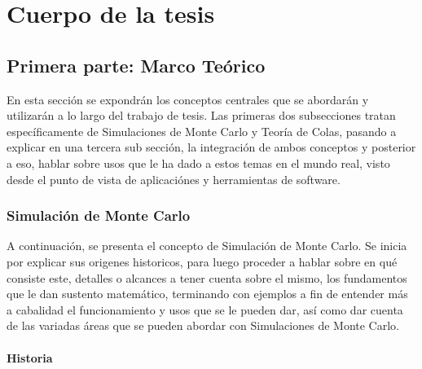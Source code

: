 \chapter{Cuerpo de la tesis}
\label{cap:cuerpo}
\section{Primera parte: Marco Teórico} %
\label{sec:primera}

\noindent En esta sección se expondrán los conceptos centrales que se abordarán y utilizarán a lo largo del trabajo de tesis. Las primeras dos subsecciones tratan específicamente de Simulaciones de Monte Carlo y Teoría de Colas, pasando a explicar en una tercera sub sección, la integración de ambos conceptos y posterior a eso, hablar sobre usos que le ha dado a estos temas en el mundo real, visto desde el punto de vista de aplicaciónes y herramientas de software.

\subsection{Simulación de Monte Carlo} %

\noindent A continuación, se presenta el concepto de Simulación de Monte Carlo. Se inicia por explicar sus origenes historicos, para luego proceder a hablar sobre en qué consiste este, detalles o alcances a tener cuenta sobre el mismo, los fundamentos que le dan sustento matemático, terminando con ejemplos a fin de entender más a cabalidad el funcionamiento y usos que se le pueden dar, así como dar cuenta de las variadas áreas que se pueden abordar con Simulaciones de Monte Carlo.

\subsubsection{Historia} %

